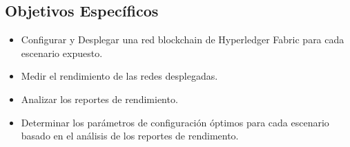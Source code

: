 \subsection{Objetivos Espec\'ificos}
\begin{itemize}
\item Configurar y Desplegar una red blockchain de Hyperledger Fabric para cada escenario expuesto.
\item Medir el rendimiento de las redes desplegadas.
\item Analizar los reportes de rendimiento.
\item Determinar los par\'ametros de configuraci\'on \'optimos para cada escenario basado en el an\'alisis de los reportes de rendimento.
\end{itemize}

